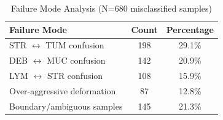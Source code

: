 \begin{table}[t]
\centering
\caption{Failure Mode Analysis (N=680 misclassified samples)}
\label{tab:failure}
\begin{tabularx}{\textwidth}{Xcc}
\hline
\textbf{Failure Mode} & \textbf{Count} & \textbf{Percentage} \\
\hline
STR $\leftrightarrow$ TUM confusion & 198 & 29.1\% \\
DEB $\leftrightarrow$ MUC confusion & 142 & 20.9\% \\
LYM $\leftrightarrow$ STR confusion & 108 & 15.9\% \\
Over-aggressive deformation & 87 & 12.8\% \\
Boundary/ambiguous samples & 145 & 21.3\% \\
\hline
\end{tabularx}
\end{table}